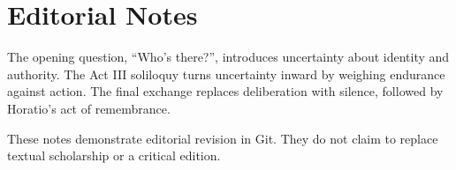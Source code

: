 \section*{Editorial Notes}
The opening question, ``Who's there?'', introduces uncertainty about identity
and authority. The Act III soliloquy turns uncertainty inward by weighing
endurance against action. The final exchange replaces deliberation with
silence, followed by Horatio's act of remembrance.

These notes demonstrate editorial revision in Git. They do not claim to
replace textual scholarship or a critical edition.
